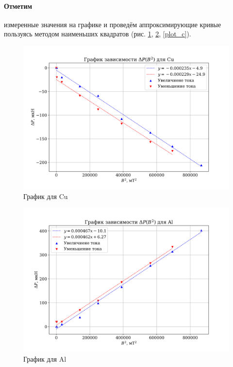 \documentclass[a4paper,12pt]{article} %
\begin{document}
\paragraph{Отметим} измеренные значения на графике и проведём аппроксимирующие кривые пользуясь методом наименьших квадратов (рис. \ref{plot_cu}, \ref{plot_al}, \ref{plot_c}).

\begin{figure}
\begin{center}
\includegraphics[width=\linewidth]{plot_cu.png}
\caption{График для Cu}
\label{plot_cu}
\end{center}
\end{figure}

\begin{figure}
\begin{center}
\includegraphics[width=\linewidth]{plot_al.png}
\caption{График для Al}
\label{plot_al}
\end{center}
\end{figure}
\end{document}
